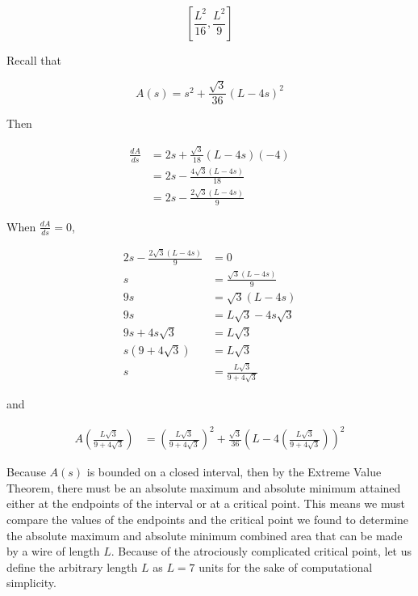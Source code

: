 \documentclass{article}
\begin{document}
    \[
        \left[\frac{L^2}{16}, \frac{L^2}{9}\right]
    \]

    Recall that

    \[
        A(s) = s^2 + \frac{\sqrt{3}}{36}(L-4s)^2
    \]

    Then

    \begin{align*}
        \frac{dA}{ds}   &= 2s + \frac{\sqrt{3}}{18}(L-4s)(-4) \\
                        &= 2s - \frac{4\sqrt{3}(L-4s)}{18} \\
                        &= 2s - \frac{2\sqrt{3}(L-4s)}{9}
    \end{align*}

    When $\frac{dA}{ds}=0$,

    \begin{align*}
        2s  - \frac{2\sqrt{3}(L-4s)}{9} &= 0 \\
        s                               &= \frac{\sqrt{3}(L-4s)}{9} \\
        9s                              &= \sqrt{3}(L-4s) \\
        9s                              &= L\sqrt{3} - 4s\sqrt{3} \\
        9s+4s\sqrt{3}                   &= L\sqrt{3} \\
        s(9+4\sqrt{3})                  &= L\sqrt{3} \\
        s                               &= \frac{L\sqrt{3}}{9+4\sqrt{3}}
    \end{align*}

    and

    \pagebreak

    \begin{align*}
        A\left(\frac{L\sqrt{3}}{9+4\sqrt{3}}\right) &= \left(\frac{L\sqrt{3}}{9+4\sqrt{3}}\right)^2 + \frac{\sqrt{3}}{36}\left(L-4\left(\frac{L\sqrt{3}}{9+4\sqrt{3}}\right)\right)^2
    \end{align*}

    Because $A(s)$ is bounded on a closed interval, then by the Extreme Value Theorem, there must be an absolute maximum and absolute minimum attained either at the endpoints of the interval or at a critical point.
    This means we must compare the values of the endpoints and the critical point we found to determine the absolute maximum and absolute minimum combined area that can be made by a wire of length $L$. Because of the
    atrociously complicated critical point, let us define the arbitrary length $L$ as $L=7$ units for the sake of computational simplicity. \\
\end{document}

